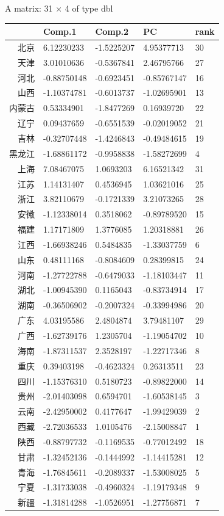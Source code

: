 \documentclass[UTF8,a4paper]{ctexart}
\begin{document}
    
    A matrix: 31 × 4 of type dbl
\begin{tabular}{r|llll}
  & Comp.1 & Comp.2 & PC & rank\\
\hline
	北京 &  6.12230233 & -1.5225207 &  4.95377713 & 30\\
	天津 &  3.01010636 & -0.5367841 &  2.46795766 & 27\\
	河北 & -0.88750148 & -0.6923451 & -0.85767147 & 16\\
	山西 & -1.10374781 & -0.6013737 & -1.02695901 & 13\\
	内蒙古 &  0.53334901 & -1.8477269 &  0.16939720 & 22\\
	辽宁 &  0.09437659 & -0.6551539 & -0.02019052 & 21\\
	吉林 & -0.32707448 & -1.4246843 & -0.49484615 & 19\\
	黑龙江 & -1.68861172 & -0.9958838 & -1.58272699 &  4\\
	上海 &  7.08467075 &  1.0693203 &  6.16521342 & 31\\
	江苏 &  1.14131407 &  0.4536945 &  1.03621016 & 25\\
	浙江 &  3.82110679 & -0.1721339 &  3.21073265 & 28\\
	安徽 & -1.12338014 &  0.3518062 & -0.89789520 & 15\\
	福建 &  1.17171809 &  1.3776085 &  1.20318881 & 26\\
	江西 & -1.66938246 &  0.5484835 & -1.33037759 &  6\\
	山东 &  0.48111168 & -0.8084609 &  0.28399815 & 24\\
	河南 & -1.27722788 & -0.6479033 & -1.18103447 & 11\\
	湖北 & -1.00945390 &  0.1165043 & -0.83734914 & 17\\
	湖南 & -0.36506902 & -0.2007324 & -0.33994986 & 20\\
	广东 &  4.03195586 &  2.4804874 &  3.79481107 & 29\\
	广西 & -1.62739176 &  1.2305704 & -1.19054702 & 10\\
	海南 & -1.87311537 &  2.3528197 & -1.22717346 &  8\\
	重庆 &  0.39403198 & -0.4623324 &  0.26313511 & 23\\
	四川 & -1.15376310 &  0.5180723 & -0.89822000 & 14\\
	贵州 & -2.01403098 &  0.6594701 & -1.60538145 &  3\\
	云南 & -2.42950002 &  0.4177647 & -1.99429039 &  2\\
	西藏 & -2.72036533 &  1.0105476 & -2.15008847 &  1\\
	陕西 & -0.88797732 & -0.1169535 & -0.77012492 & 18\\
	甘肃 & -1.32452136 & -0.1444992 & -1.14415281 & 12\\
	青海 & -1.76845611 & -0.2089337 & -1.53008025 &  5\\
	宁夏 & -1.31733038 & -0.4960324 & -1.19179348 &  9\\
	新疆 & -1.31814288 & -1.0526951 & -1.27756871 &  7\\
\end{tabular}
\end{document}
